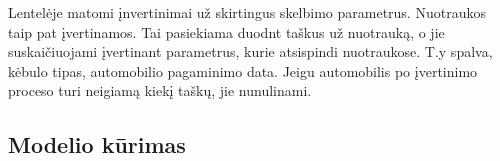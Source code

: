 \documentclass{VUMIFPSkursinis}
\begin{document}
Lentelėje matomi įnvertinimai už skirtingus skelbimo parametrus. Nuotraukos taip pat įvertinamos. Tai pasiekiama duodnt taškus už nuotrauką, o jie suskaičiuojami įvertinant parametrus, kurie atsispindi nuotraukose. T.y spalva, kėbulo tipas, automobilio pagaminimo data. Jeigu automobilis po įvertinimo proceso turi neigiamą kiekį taškų, jie nunulinami.

\subsection{Modelio kūrimas}





\printbibliography[heading=bibintoc]  %

\end{document}
